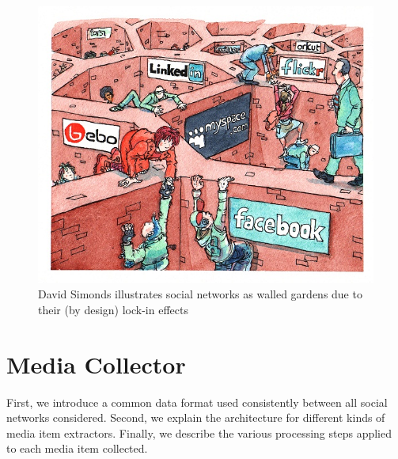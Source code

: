 \begin{figure}
 \centering
 \includegraphics[width=1.0\linewidth,trim=16px 17px 12px 15px,clip]{davidsimonds.jpg}
 \caption{David Simonds illustrates social networks as walled gardens due to their (by design) lock-in effects~\cite{DavidSimonds}}
 \label{fig:DavidSimonds}
\end{figure}


\section{Media Collector}                                                   \label{sec:media-collector}
First, we introduce a common data format used consistently between all social networks considered.
Second, we explain the architecture for different kinds of media item extractors. Finally,
we describe the various processing steps applied to each media item collected.

